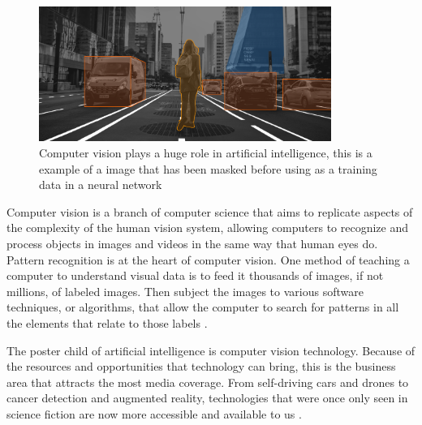 \begin{figure}[ht]
    \centering
    \includegraphics[width=0.85\textwidth]{graphics/mask.png}
    \caption{Computer vision plays a huge role in artificial intelligence, this is a example of a image that has been masked before using as a training data in a neural network  \cite{ambalina_5_2020}}
    \label{fig:mask}
\end{figure}

Computer vision is a branch of computer science that aims to replicate aspects of the complexity of the human vision system, allowing computers to recognize and process objects in images and videos in the same way that human eyes do. Pattern recognition is at the heart of computer vision. One method of teaching a computer to understand visual data is to feed it thousands of images, if not millions, of labeled images. Then subject the images to various software techniques, or algorithms, that allow the computer to search for patterns in all the elements that relate to those labels \cite{mihajlovic_everything_nodate}.

The poster child of artificial intelligence is computer vision technology. Because of the resources and opportunities that technology can bring, this is the business area that attracts the most media coverage. From self-driving cars and drones to cancer detection and augmented reality, technologies that were once only seen in science fiction are now more accessible and available to us \cite{ambalina_5_2020}.




